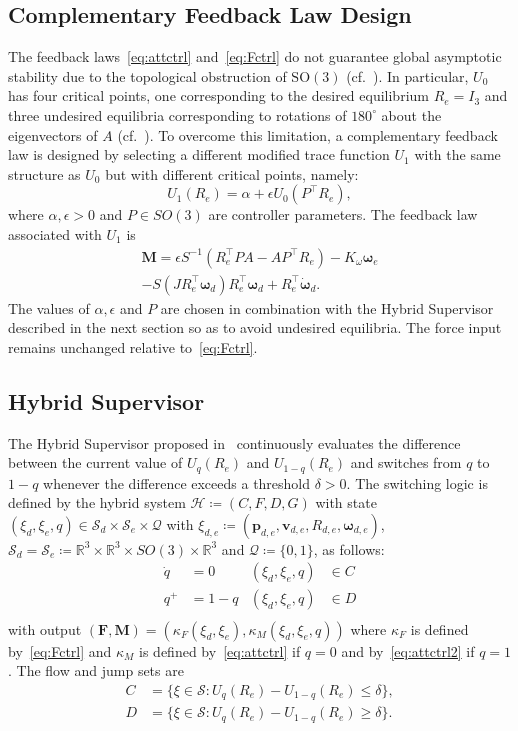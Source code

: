 \documentclass[journal]{IEEEtran}
\newcommand{\tp}{^\top}
\newcommand{\eye}[1]{I_{#1}}
\begin{document}
\subsection{Complementary Feedback Law Design}
The feedback laws~\eqref{eq:attctrl} and~\eqref{eq:Fctrl} do not guarantee global asymptotic stability due to the topological obstruction of $\mathrm{SO}(3)$ (cf.~\cite{bhat_topological_2000}). In particular, $U_0$ has four critical points, one corresponding to the desired equilibrium $R_e=\eye{3}$ and three undesired equilibria corresponding to rotations of $180^{\circ}$ about the eigenvectors of $A$ (cf.~\cite{mayhew_synergistic_2013}). To overcome this limitation, a complementary feedback law is designed by selecting a different modified trace function $U_1$ with the same structure as $U_0$ but with different critical points, namely:
\begin{equation}\label{eq:U1}
  U_1(R_e) = \alpha+\epsilon U_0(P\tp R_e),
\end{equation} 
where $\alpha,\epsilon>0$ and $P\in SO(3)$ are controller parameters. The feedback law associated with $U_1$ is
\begin{multline}\label{eq:attctrl2}
  \bm{M} = \epsilon S^{-1}(R_e\tp P A - A P\tp R_e) - K_\omega \bm{\omega}_e \\
  - S(JR_e\tp\bm{\omega}_d)R_e\tp\bm{\omega}_d + R_e\tp\dot{\bm{\omega}}_d.
\end{multline}
The values of $\alpha,\epsilon$ and $P$ are chosen in combination with the Hybrid Supervisor described in the next section so as to avoid undesired equilibria. The force input remains unchanged relative to~\eqref{eq:Fctrl}.

\subsection{Hybrid Supervisor}
The Hybrid Supervisor proposed in~\cite{mayhew_synergistic_2013} continuously evaluates the difference between the current value of $U_q(R_e)$ and $U_{1-q}(R_e)$ and switches from $q$ to $1-q$ whenever the difference exceeds a threshold $\delta>0$. The switching logic is defined by the hybrid system $\mathcal{H}\coloneqq (C,F,D,G)$ with state $(\xi_d,\xi_e,q)\in\mathcal{S}_d\times\mathcal{S}_e\times \mathcal{Q}$ with $\xi_{d,e}\coloneqq (\bm{p}_{d,e},\bm{v}_{d,e},R_{d,e},\bm{\omega}_{d,e})$, $\mathcal{S}_{d}=\mathcal{S}_{e}\coloneqq \mathbb{R}^3\times\mathbb{R}^3\times SO(3)\times\mathbb{R}^3$ and $\mathcal{Q}\coloneqq\{0,1\}$, as follows:
\begin{align*}
  \dot{q}&=0 & (\xi_d,\xi_e,q)&\in C\\
  q^+&=1-q & (\xi_d,\xi_e,q)&\in D\\
\end{align*}
with output $(\bm{F},\bm{M})=(\kappa_F(\xi_d,\xi_e),\kappa_M(\xi_d,\xi_e,q))$ where $\kappa_F$ is defined by~\eqref{eq:Fctrl} and $\kappa_M$ is defined by~\eqref{eq:attctrl} if $q=0$ and by~\eqref{eq:attctrl2} if $q=1$. The flow and jump sets are
\begin{align*}
  C &= \{\xi\in\mathcal{S}: U_q(R_e)-U_{1-q}(R_e)\leq\delta\},\\
  D &= \{\xi\in\mathcal{S}: U_q(R_e)-U_{1-q}(R_e)\geq\delta\}.
\end{align*}
\end{document}
